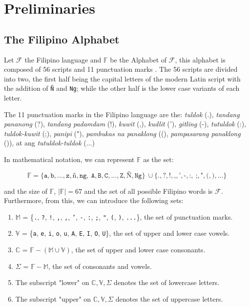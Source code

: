 \section{Preliminaries}
\subsection{The Filipino Alphabet}

Let \(\mathcal{F}\) the Filipino language
and \(\mathbb{F}\) be the Alphabet of \(\mathcal{F}\), this alphabet is
composed of 56 scripts and 11 punctuation marks \cite{OOP}. The 56 scripts are divided into
two, the first half being the capital letters of the modern Latin script with
the addition of \texttt{Ñ} and \texttt{Ng}; while the other half is the lower case variants
of each letter.

The 11 punctuation marks in the Filipino language are the: \textit{tuldok} (.),
\textit{tandang pananong} (?), \textit{tandang padamdam} (!), \textit{kuwit} (,),
\textit{kudlit} ('), \textit{\textit{gitling}} (-), \textit{tutuldok} (:),
\textit{tuldok-kuwit} (;), \textit{panipi} ("), \textit{pambukas na panaklong}
((), \textit{pampasarang panaklong} ()), at ang \textit{tutuldok-tuldok} (...)

In mathematical notation, we can represent \(\mathbb{F}\) as the set:

\[
      \mathbb{F} = \{\texttt{a},\texttt{b},\dots,\texttt{z},\texttt{ñ},\texttt{ng},   \
      \texttt{A},\texttt{B},\texttt{C},\dots,\texttt{Z},\texttt{Ñ},\texttt{Ng}\}         \
      \cup \{\texttt{.},\texttt{?},\texttt{!},\texttt{,},\texttt{'},\texttt{-},\texttt{:}, \
      \texttt{;},\texttt{"},\texttt{(},\texttt{)}, \texttt{...}\}
\]

and the size of \(\mathbb{F}\), \(\mid\mathbb{F}\mid = 67\) and the set of all possible Filipino words is $\mathcal{F}$. Furthermore, from this, we can introduce the following sets:
\begin{enumerate}
      \item \(\mathbb{M}\) = \{\texttt{.}, \texttt{?}, \texttt{!}, \texttt{,}, \texttt{,}, \texttt{'}, \texttt{-}, \texttt{:}, \texttt{;}, \texttt{"}, \texttt{(}, \texttt{)}, \texttt{...}\}, the set of punctuation marks.
      \item \(\mathbb{V}\) = \{\texttt{a}, \texttt{e}, \texttt{i}, \texttt{o}, \texttt{u}, \texttt{A}, \texttt{E}, \texttt{I}, \texttt{O}, \texttt{U}\}, the set of upper and lower case vowels.
      \item \(\mathbb{C}\) = \(\mathbb{F} - (\mathbb{M} \cup \mathbb{V})\),
            the set of upper and lower case consonants.
      \item \(\Sigma\) = \(\mathbb{F} - \mathbb{M}\), the set of consonants and vowels.
      \item The subscript "lower" on \(\mathbb{C}, \mathbb{V}, \Sigma\) denotes the set of lowercase letters.
      \item The subscript "upper" on \(\mathbb{C}, \mathbb{V}, \Sigma\) denotes the set of uppercase letters.
\end{enumerate}


